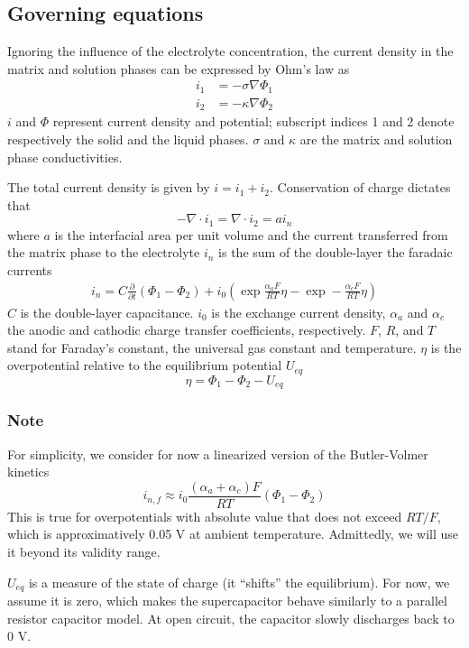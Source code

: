 \subsection{Governing equations}
Ignoring the influence of the electrolyte concentration, the current density
in the matrix and solution phases can be expressed by Ohm's law as
\begin{align}
    i_1 &= - \sigma \nabla \Phi_1 \\
    i_2 &= - \kappa \nabla \Phi_2
\end{align}
$i$ and $\Phi$ represent current density and potential; subscript indices
1 and 2 denote respectively the solid and the liquid phases.
$\sigma$ and $\kappa$ are the matrix and solution phase conductivities.

The total current density is given by $i = i_1 + i_2$.  Conservation of
charge dictates that
\begin{equation}
    -\nabla \cdot i_1 = \nabla \cdot i_2 = a i_n
\end{equation}
where $a$ is the interfacial area per unit volume and the current transferred
from the matrix phase to the electrolyte $i_n$ is the sum of the double-layer
the faradaic currents
\begin{align}
    i_n %
    = C \frac{\partial}{\partial t} (\Phi_1 - \Phi_2)
    + i_0 \left(
        \exp  \frac{\alpha_a F}{RT} \eta
        -
        \exp -\frac{\alpha_c F}{RT} \eta
    \right)
\end{align}
$C$ is the double-layer capacitance.  $i_0$ is the exchange current density,
$\alpha_a$ and $\alpha_c$ the anodic and cathodic charge transfer
coefficients, respectively.
$F$, $R$, and $T$ stand for Faraday's constant, the universal gas constant and
temperature.
$\eta$ is the overpotential relative to the equilibrium potential $U_{eq}$
\begin{equation}
    \eta = \Phi_1  - \Phi_2 - U_{eq}
\end{equation}

\subsubsection{Note}
For simplicity, we consider for now a linearized version of the Butler-Volmer
kinetics
\begin{equation}
    i_{n,f} \approx 
        i_0 \frac{(\alpha_a + \alpha_c) F}{RT} \left( \Phi_1 - \Phi_2 \right)
\end{equation}
This is true for overpotentials with absolute value that does not exceed
$RT/F$, which is approximatively 0.05 V at ambient temperature.
Admittedly, we will use it beyond its validity range.

$U_{eq}$ is a measure of the state of charge (it ``shifts'' the equilibrium).
For now, we assume it is zero, which makes the supercapacitor behave similarly
to a parallel resistor capacitor model.  At open circuit, the capacitor slowly
discharges back to 0 V.

